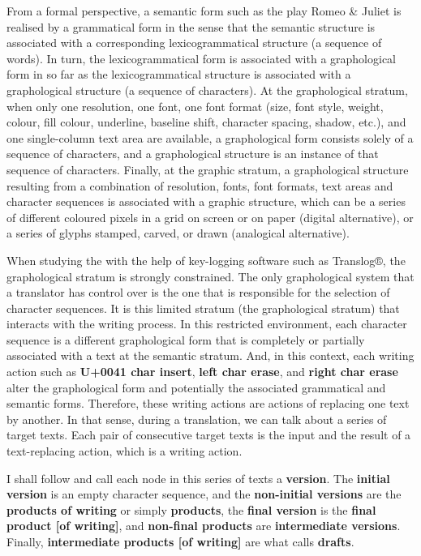 \documentclass[output=paper]{LSP/langsci}
\begin{document}
From a formal perspective, a semantic form such as the play Romeo \& Juliet is realised by a grammatical form in the sense that the semantic structure is associated with a corresponding lexicogrammatical structure (a sequence of words). In turn, the lexicogrammatical form is associated with a graphological form in so far as the lexicogrammatical structure is associated with a graphological structure (a sequence of characters). At the graphological stratum, when only one resolution, one font, one font format (size, font style, weight, colour, fill colour, underline, baseline shift, character spacing, shadow, etc.), and one single-column text area are available, a graphological form consists solely of a sequence of characters, and a graphological structure is an instance of that sequence of characters. Finally, at the graphic stratum, a graphological structure resulting from a combination of resolution, fonts, font formats, text areas and character sequences is associated with a graphic structure, which can be a series of different coloured pixels in a grid on screen or on paper (digital alternative), or a series of glyphs stamped, carved, or drawn (analogical alternative).

When studying the  with the help of key-logging software such as Trans\-log®, the graphological stratum is strongly constrained. The only graphological system that a translator has control over is the one that is responsible for the selection of character sequences. It is this limited stratum (the graphological stratum) that interacts with the writing process. In this restricted environment, each character sequence is a different graphological form that is completely or partially associated with a text at the semantic stratum. And, in this context, each writing action such as \textbf{U+0041 char insert}, \textbf{left char erase}, and \textbf{right char erase} alter the graphological form and potentially the associated grammatical and semantic forms. Therefore, these writing actions are actions of replacing one text by another. In that sense, during a translation, we can talk about a series of target texts. Each pair of consecutive target texts is the input and the result of a text-replacing action, which is a writing action.

I shall follow \citet{Halliday:1987th} and call each node in this series of texts a \textbf{version}. The \textbf{initial version} is an empty character sequence, and the \textbf{non-initial versions} are the \textbf{products of writing} or simply \textbf{products}, the \textbf{final version} is the \textbf{final product [of writing]}, and \textbf{non-final products} are \textbf{intermediate versions}. Finally, \textbf{intermediate products [of writing]} are what \citeauthor{Halliday:1987th} calls \textbf{drafts}.
\end{document}
